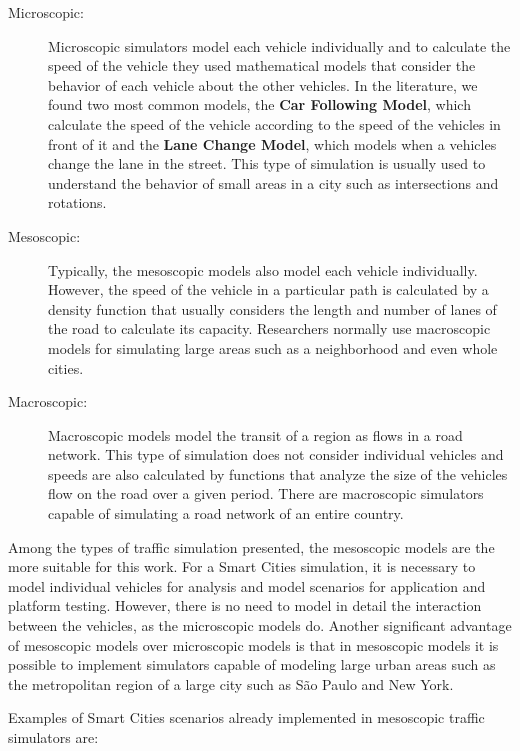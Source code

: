 \begin{description}

\item[Microscopic:] Microscopic simulators model each vehicle individually and to calculate the speed of the vehicle they used mathematical models that consider the behavior of each vehicle about the other vehicles. In the literature, we found two most common models, the \textbf{Car Following Model}, which calculate the speed of the vehicle according to the speed of the vehicles in front of it and the \textbf{Lane Change Model}, which models when a vehicles change the lane in the street. This type of simulation is usually used to understand the behavior of small areas in a city such as intersections and rotations.

\item[Mesoscopic:] Typically, the mesoscopic models also model each vehicle individually. However, the speed of the vehicle in a particular path is calculated by a density function that usually considers the length and number of lanes of the road to calculate its capacity.  Researchers normally use macroscopic models for simulating large areas such as a neighborhood and even whole cities.

\item[Macroscopic:] Macroscopic models model the transit of a region as flows in a road network. This type of simulation does not consider individual vehicles and speeds are also calculated by functions that analyze the size of the vehicles flow on the road over a given period. There are macroscopic simulators capable of simulating a road network of an entire country.

\end{description}

Among the types of traffic simulation presented, the mesoscopic models are the more suitable for this work. For a Smart Cities simulation, it is necessary to model individual vehicles for analysis and model scenarios for application and platform testing. However, there is no need to model in detail the interaction between the vehicles, as the microscopic models do. Another significant advantage of mesoscopic models over microscopic models is that in mesoscopic models it is possible to implement simulators capable of modeling large urban areas such as the metropolitan region of a large city such as São Paulo and New York.

Examples of Smart Cities scenarios already implemented in mesoscopic traffic simulators are:

